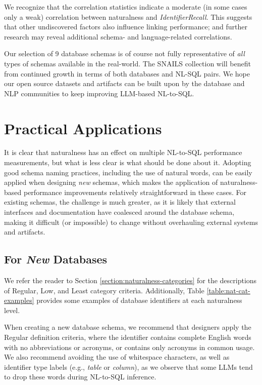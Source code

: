 We recognize that the correlation statistics indicate a moderate (in some cases only a weak) correlation between naturalness and \emph{IdentifierRecall}.
This suggests that other undiscovered factors also influence linking performance; and further research may reveal additional schema- and language-related correlations.

Our selection of 9 database schemas is of course not fully representative of \emph{all} types of schemas available in the real-world.
The SNAILS collection will benefit from continued growth in terms of both databases and NL-SQL pairs.
We hope our open source datasets and artifacts can be built upon by the database and NLP communities to keep improving LLM-based NL-to-SQL.




\section{Practical Applications}

It is clear that naturalness has an effect on multiple NL-to-SQL performance measurements, but what is less clear is what should be done about it.
Adopting good schema naming practices, including the use of natural words, can be easily applied when designing \emph{new} schemas, which makes the application of naturalness-based performance improvements relatively straightforward in these cases.
For existing schemas, the challenge is much greater, as it is likely that external interfaces and documentation have coalesced around the database schema, making it difficult (or impossible) to change without overhauling external systems and artifacts.

\subsection{For \emph{New} Databases}
We refer the reader to Section \ref{section:naturalness-categories} for the descriptions of Regular, Low, and Least category criteria. 
Additionally, Table \ref{table:nat-cat-examples} provides some examples of database identifiers at each naturalness level.

When creating a new database schema, we recommend that designers apply the Regular definition criteria, where the identifier contains complete English words with no abbreviations or acronyms, or contains only acronyms in common usage.
We also recommend avoiding the use of whitespace characters, as well as identifier type labels (e.g., \emph{table} or \emph{column}), as we observe that some LLMs tend to drop these words during NL-to-SQL inference.

